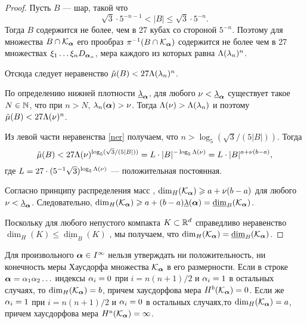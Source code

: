 \begin{proof}
Пусть $B$ --- шар, такой что
\begin{equation}\label{ner}
{\sqrt{3}}\cdot 5^{-n-1}<|B|\le{\sqrt{3}}\cdot 5^{-n}.
\end{equation}
Тогда $B$ содержится не более, чем в 27 кубах со стороной $5^{-n}$. 
Поэтому для множества $B\cap {\mathcal K}_{\bm{\alpha}}$  его прообраз $\pi^{-1}(B\cap {\mathcal K}_{\bm{\alpha}})$ содержится не более чем в 27 множествах  $\xi_1\ldots \xi_n D_{{\bm{\alpha}}_n}$, мера каждого из которых равна $\Lambda(\lambda_n)^n$.

Отсюда следует неравенство $\tilde\mu(B)<27\Lambda(\lambda_n)^n$.

По определению нижней плотности $\underline{\lambda}_{\bm{\alpha}}$, для любого $\nu<\underline{\lambda}_{\bm{\alpha}}$ существует такое $N\in\mathbb{N}$, что при $n>N$, $\lambda_n({\bm{\alpha}}) > \nu$. 
Тогда $\Lambda(\nu)>\Lambda(\lambda_n)$  и поэтому  $\tilde\mu(B)<27\Lambda(\nu)^n$.

Из левой части неравенства \eqref{ner} получаем, что $n>\log_5(\sqrt{3}/(5|B|))$.
Тогда 
\begin{equation}
\tilde\mu(B)<27 \Lambda(\nu)^{\log_5(\sqrt{3}/(5|B|))}=L\cdot|B|^{-\log_5{\Lambda(\nu)}} =L\cdot |B|^{a+\nu(b-a)},
\end{equation}
где $L=27\cdot(5^{-1}\sqrt{3})^{\log_5{\Lambda(\nu)}}$ --- положительная постоянная.

Согласно принципу распределения масс \cite[Mass distribution Principle~4.2, p.55]{Falconer2004}, $\dim_H({\mathcal K}_{\bm{\alpha}})\geqslant a+\nu(b-a)$ для любого $\nu<\underline{\lambda}_{\bm{\alpha}}$.
Следовательно, $\dim_H({\mathcal K}_{\bm{\alpha}})\geqslant  a+(b-a)\underline{\lambda}({\bm{\alpha}}) =\underline{\dim}_B({\mathcal K}_{\bm{\alpha}})$.

Поскольку  для любого непустого компакта $K\subset\mathbb{R}^d$ справедливо неравенство $\dim_H(K)\leqslant\underline{\dim}_B(K)$ \cite[(3.17), p.~43]{Falconer2004}, мы получаем, что $\dim_H( {\mathcal K}_{\bm{\alpha}})=\underline{\dim}_B( {\mathcal K}_{\bm{\alpha}})$.
\end{proof}

\begin{remark} 
Для произвольного ${\bm{\alpha}}\in I^\infty$ нельзя утверждать ни положительность, ни конечность меры Хаусдорфа множества ${\mathcal K}_{\bm{\alpha}}$ в его размерности. 
Если в строке ${\bm{\alpha}}=\alpha_1\alpha_2\ldots$ индексы $\alpha_i=0$ при  $i=n(n+1)/2$ и $\alpha_i=1$ в остальных случаях, то $\dim_H({\mathcal K}_{\bm{\alpha}})=b$, причем хаусдорфова мера $H^b({\mathcal K}_{\bm{\alpha}})=0$.
Если же $\alpha_i=1$ при  $i=n(n+1)/2$ и $\alpha_i=0$ в остальных случаях,то $\dim_H({\mathcal K}_{\bm{\alpha}})=a$, причем хаусдорфова мера $H^a({\mathcal K}_{\bm{\alpha}})=\infty$.
\end{remark}
 
 
 
 